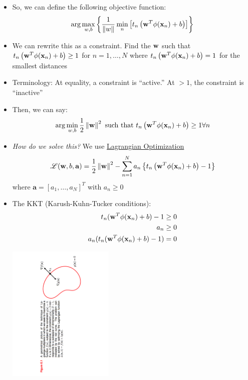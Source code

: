 \documentclass[12pt,letterpaper]{article}
\begin{document}
\begin{itemize}
\item So, we can define the following objective function:
\begin{equation}
\arg \max_{w,b} \left\{ \frac{1}{\left\|w\right\|} \min_n \left[t_n \left(\mathbf{w}^T\phi(\mathbf{x}_n) + b \right) \right]\right\}
\end{equation}
\item We can rewrite this as a constraint.  Find the $\mathbf{w}$ such that $t_n\left(\mathbf{w}^T\phi(\mathbf{x}_n) + b\right) \ge 1$ for $n = 1, \ldots, N$ where $t_n\left(\mathbf{w}^T\phi(\mathbf{x}_n) + b\right) = 1$ for the smallest distances
\item Terminology: At equality, a constraint is ``active.'' At $>1$, the constraint is ``inactive''
\item Then, we can say:
\begin{equation}
\arg \min_{w,b} \frac{1}{2}\left\|\mathbf{w}\right\|^2 \text{ such that }  t_n \left(\mathbf{w}^T\phi(\mathbf{x}_n) + b \right)  \ge 1 \forall n
\end{equation}
\item \emph{How do we solve this?}  We use \underline{Lagrangian Optimization}
\begin{equation}
\mathscr{L}(\mathbf{w},b,\mathbf{a}) =  \frac{1}{2}\left\|\mathbf{w}\right\|^2 - \sum_{n=1}^N a_n \left\{  t_n \left(\mathbf{w}^T\phi(\mathbf{x}_n) + b \right)  - 1 \right\}
\end{equation}
where $\mathbf{a} = \left[ a_1, \ldots, a_N\right]^T$ with $a_n \ge 0$
\item The KKT (Karush-Kuhn-Tucker conditions):
\begin{eqnarray}
t_n(\mathbf{w}^T\phi(\mathbf{x}_n) + b) -1 \ge 0\\
a_n \ge 0\\
a_n (t_n(\mathbf{w}^T\phi(\mathbf{x}_n) + b) -1 ) = 0
\end{eqnarray}


\begin{center}\includegraphics[width=2in, trim=5cm .5cm 4cm 1cm, clip=true, angle=270]{fig1.pdf}\end{center}



\end{itemize}
\end{document}
